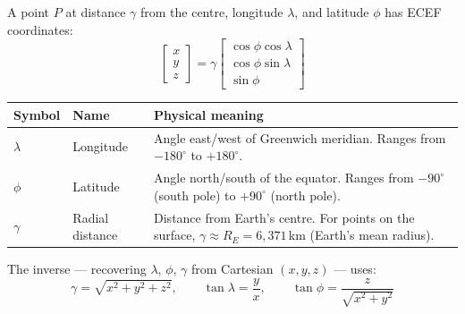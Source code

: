 \documentclass[12pt, a4paper]{article}
\begin{document}
A point $P$ at distance $\gamma$ from the centre, longitude $\lambda$,
and latitude $\phi$ has ECEF coordinates:
\[
  \begin{bmatrix} x \\ y \\ z \end{bmatrix}
  = \gamma
    \begin{bmatrix}
      \cos\phi\cos\lambda \\
      \cos\phi\sin\lambda \\
      \sin\phi
    \end{bmatrix}
\]

\begin{center}
\begin{tabular}{@{} l p{3.5cm} p{7.5cm} @{}}
  \toprule
  Symbol & Name & Physical meaning \\
  \midrule
  $\lambda$ & Longitude & Angle east/west of Greenwich meridian.
    Ranges from $-180^\circ$ to $+180^\circ$. \\
  $\phi$ & Latitude & Angle north/south of the equator.
    Ranges from $-90^\circ$ (south pole) to $+90^\circ$ (north pole). \\
  $\gamma$ & Radial distance & Distance from Earth's centre.
    For points on the surface, $\gamma \approx R_E = 6{,}371$\,km
    (Earth's mean radius). \\
  \bottomrule
\end{tabular}
\end{center}

The inverse --- recovering $\lambda$, $\phi$, $\gamma$ from
Cartesian $(x, y, z)$ --- uses:
\[
  \gamma = \sqrt{x^2+y^2+z^2}, \qquad
  \tan\lambda = \frac{y}{x}, \qquad
  \tan\phi = \frac{z}{\sqrt{x^2+y^2}}
\]
\end{document}
